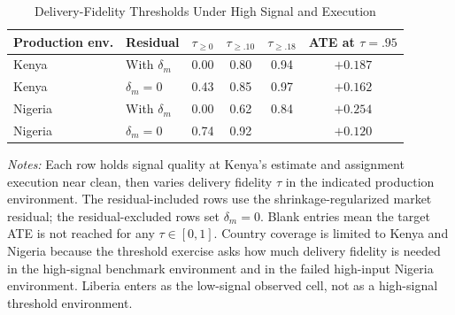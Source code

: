 \begin{table}[H]
\centering
\caption{Delivery-Fidelity Thresholds Under High Signal and Execution}
\label{tab:struct_delivery_thresholds}
\begin{threeparttable}
\footnotesize
\begin{tabular}[t]{@{}llcccc@{}}
\toprule
Production env. & Residual & $\tau_{\geq 0}$ & $\tau_{\geq .10}$ & $\tau_{\geq .18}$ & ATE at $\tau=.95$ \\
\midrule
Kenya & With $\delta_m$ & 0.00 & 0.80 & 0.94 & $+0.187$ \\
Kenya & $\delta_m=0$ & 0.43 & 0.85 & 0.97 & $+0.162$ \\
Nigeria & With $\delta_m$ & 0.00 & 0.62 & 0.84 & $+0.254$ \\
Nigeria & $\delta_m=0$ & 0.74 & 0.92 &  & $+0.120$ \\
\bottomrule
\end{tabular}
\begin{tablenotes}
\footnotesize
\item \textit{Notes:} Each row holds signal quality at Kenya's estimate and assignment execution near clean, then varies delivery fidelity $\tau$ in the indicated production environment. The residual-included rows use the shrinkage-regularized market residual; the residual-excluded rows set $\delta_m=0$. Blank entries mean the target ATE is not reached for any $\tau\in[0,1]$. Country coverage is limited to Kenya and Nigeria because the threshold exercise asks how much delivery fidelity is needed in the high-signal benchmark environment and in the failed high-input Nigeria environment. Liberia enters as the low-signal observed cell, not as a high-signal threshold environment.
\end{tablenotes}
\end{threeparttable}
\end{table}
